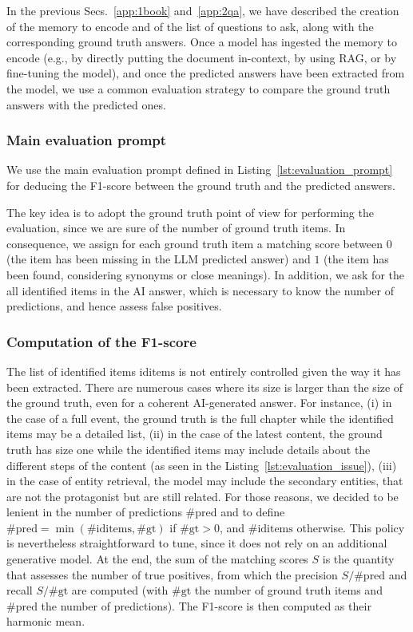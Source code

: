 \documentclass{article}
\begin{document}
In the previous Secs.~\ref{app:1book} and~\ref{app:2qa}, we have described the creation of the memory to encode and of the list of questions to ask, along with the corresponding ground truth answers.
Once a model has ingested the memory to encode (e.g., by directly putting the document in-context, by using RAG, or by fine-tuning the model), and once the predicted answers have been extracted from the model, we use a common evaluation strategy to compare the ground truth answers with the predicted ones.

\subsubsection{Main evaluation prompt}

We use the main evaluation prompt defined in Listing~\ref{lst:evaluation_prompt} for deducing the F1-score between the ground truth and the predicted answers.

The key idea is to adopt the ground truth point of view for performing the evaluation, since we are sure of the number of ground truth items. In consequence, we assign for each ground truth item a matching score between $0$ (the item has been missing in the LLM predicted answer) and $1$ (the item has been found, considering synonyms or close meanings). In addition, we ask for the all identified items in the AI answer, which is necessary to know the number of predictions, and hence assess false positives.

\subsubsection{Computation of the F1-score}\label{app:evaluation_F1_score}

The list of identified items $\text{iditems}$ is not entirely controlled given the way it has been extracted. There are numerous cases where its size is larger than the size of the ground truth, even for a coherent AI-generated answer. For instance, (i) in the case of a full event, the ground truth is the full chapter while the identified items may be a detailed list, (ii) in the case of the latest content, the ground truth has size one while the identified items may include details about the different steps of the content (as seen in the Listing~\ref{lst:evaluation_issue}), (iii) in the case of entity retrieval, the model may include the secondary entities, that are not the protagonist but are still related. For those reasons, we decided to be lenient in the number of predictions $\#\text{pred}$ and to define $\#\text{pred} = \min \left( \#\text{iditems}, \#\text{gt} \right)$ if $\#\text{gt} > 0$, and $\#\text{iditems}$ otherwise. This policy is nevertheless straightforward to tune, since it does not rely on an additional generative model.
At the end, the sum of the matching scores $S$ is the quantity that assesses the number of true positives, from which the precision $S/\#\text{pred}$ and recall $S/\#\text{gt}$ are computed (with $\#\text{gt}$ the number of ground truth items and $\#\text{pred}$ the number of predictions). The F1-score is then computed as their harmonic mean.
\end{document}
